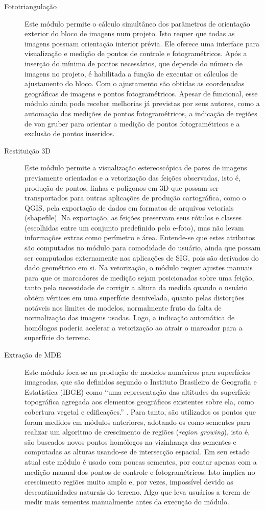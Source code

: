 \begin{description}
   \item[Fototriangulação]
   Este módulo permite o cálculo simultâneo dos parâmetros de orientação exterior do bloco de imagens num projeto. Isto requer que todas as imagens possuam orientação interior prévia. Ele oferece uma interface para visualização e medição de pontos de controle e fotogramétricos. Após a inserção do mínimo de pontos necessários, que depende do número de imagens no projeto, é habilitada a função de executar os cálculos de ajustamento do bloco. Com o ajustamento são obtidas as coordenadas geográficas de imagens e pontos fotogramétricos. Apesar de funcional, esse módulo ainda pode receber melhorias já previstas por seus autores, como a automação das medições de pontos fotogramétricos, a indicação de regiões de von gruber para orientar a medição de pontos fotogramétricos e a exclusão de pontos inseridos.
   \item[Restituição 3D] 
   Este módulo permite a visualização estereoscópica de pares de imagens previamente orientadas e a vetorização das feições observadas, isto é, produção de pontos, linhas e polígonos em 3D que possam ser transportados para outras aplicações de produção cartográfica, como o QGIS, pela exportação de dados em formatos de arquivos vetoriais (shapefile). Na exportação, as feições preservam seus rótulos e classes (escolhidas entre um conjunto predefinido pelo e-foto), mas não levam informações extras como perímetro e área. Entende-se que estes atributos são computados no módulo para comodidade do usuário, ainda que possam ser computados externamente nas aplicações de SIG, pois são derivados do dado geométrico em si. Na vetorização, o módulo requer ajustes manuais para que os marcadores de medição sejam posicionadas sobre uma feição, tanto pela necessidade de corrigir a altura da medida quando o usuário obtém vértices em uma superfície desnivelada, quanto pelas distorções notáveis nos limites de modelos, normalmente fruto da falta de normalização das imagens usadas. Logo, a indicação automática de homólogos poderia acelerar a vetorização ao atrair o marcador para a superfície do terreno.
   \item[Extração de MDE]
   Este módulo foca-se na produção de modelos numéricos para superfícies imageadas, que são definidos segundo o Instituto Brasileiro de Geografia e Estatística (IBGE) como ``uma representação das altitudes da superfície topográfica agregada aos elementos geográficos existentes sobre ela, como cobertura vegetal e edificações.'' \cite{IBGE}. Para tanto, são utilizados os pontos que foram medidos em módulos anteriores, adotando-os como sementes para realizar um algoritmo de crescimento de regiões (\textit{region growing}), isto é, são buscados novos pontos homólogos na vizinhança das sementes e computadas as alturas usando-se de intersecção espacial. Em seu estado atual este módulo é usado com poucas sementes, por contar apenas com a medição manual dos pontos de controle e fotogramétricos. Isto implica no crescimento regiões muito amplo e, por vezes, impossível devido as descontinuidades naturais do terreno. Algo que leva usuários a terem de medir mais sementes manualmente antes da execução do módulo.
   

\end{description}
